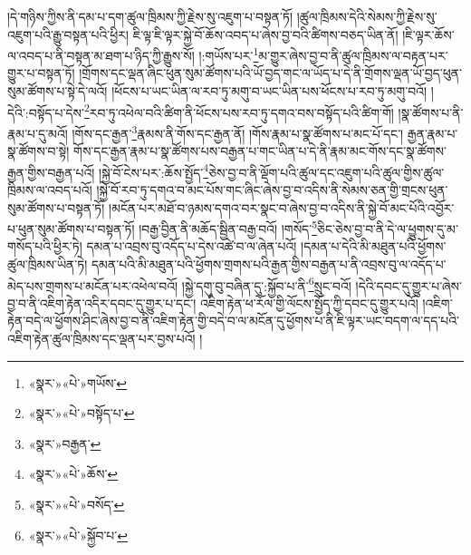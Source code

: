 །དེ་གཉིས་ཀྱིས་ནི་དམ་པ་དག་ཚུལ་ཁྲིམས་ཀྱི་རྗེས་སུ་འཇུག་པ་བསྟན་ཏོ། །ཚུལ་ཁྲིམས་དེའི་སེམས་ཀྱི་རྗེས་སུ་འཇུག་པའི་རྒྱུ་བསྟན་པའི་ཕྱིར། ཇི་ལྟ་ཇི་ལྟར་སྐྱེ་བོ་ཆོས་འབད་པ་ཞེས་བྱ་བའི་ཚིགས་བཅད་ཡིན་ནོ། །ཇི་ལྟར་ཆོས་ལ་འབད་པ་ནི་བསྟན་མ་ཐག་པ་ཉིད་ཀྱི་རྒྱུས་སོ། །:གཡོས་པར་\footnote{«སྣར་»«པེ་»གཡོས་}མ་གྱུར་ཞེས་བྱ་བ་ནི་ཚུལ་ཁྲིམས་ལ་བརྟན་པར་གྱུར་པ་བསྟན་ཏོ། །གྲོགས་དང་ལྡན་ཞིང་ཕུན་སུམ་ཚོགས་པའི་ཡོ་བྱད་གང་ལ་ཡོད་པ་དེ་ནི་གྲོགས་ལྡན་ཡོ་བྱད་ཕུན་སུམ་ཚོགས་པ་སྟེ་དེ་ལའོ། །ཕོངས་པ་ཡང་ཡིན་ལ་རབ་ཏུ་མགུ་བ་ཡང་ཡིན་པས་ཕོངས་པ་རབ་ཏུ་མགུ་བའོ། །དེའི་:བསྟོད་པ་དེས་\footnote{«སྣར་»«པེ་»བསྟོད་པ་}རབ་ཏུ་འཕེལ་བའི་ཚིག་ནི་ཕོངས་པས་རབ་ཏུ་དགའ་བས་བསྟོད་པའི་ཚིག་གོ། །སྣ་ཚོགས་པ་ནི་རྣམ་པ་དུ་མའོ། །གོས་དང་རྒྱན་\footnote{«སྣར་»བརྒྱན་}རྣམས་ནི་གོས་དང་རྒྱན་ནོ། །གོས་རྣམ་པ་སྣ་ཚོགས་པ་མང་པོ་དང་། རྒྱན་རྣམ་པ་སྣ་ཚོགས་བ་སྟེ། གོས་དང་རྒྱན་རྣམ་པ་སྣ་ཚོགས་པས་བརྒྱན་པ་གང་ཡིན་པ་དེ་ནི་རྣམ་མང་གོས་དང་སྣ་ཚོགས་རྒྱན་གྱིས་བརྒྱན་པའོ། །སྐྱེ་བོ་ངེས་པར་:ཆོས་སྤྱོད་\footnote{«སྣར་»«པེ་»ཆོས་}ཅེས་བྱ་བ་ནི་ལྡོག་པའི་ཚུལ་དང་འཇུག་པའི་ཚུལ་གྱིས་ཚུལ་ཁྲིམས་ལ་འབད་པའོ། །སྐྱེ་བོ་རབ་ཏུ་དགའ་བ་མང་པོས་གང་ཞིང་ཞེས་བྱ་བ་འདིས་ནི་སེམས་ཅན་གྱི་གྲངས་ཕུན་སུམ་ཚོགས་པ་བསྟན་ཏོ། །མངོན་པར་མཐོ་བ་ཉམས་དགའ་བར་སྣང་བ་ཞེས་བྱ་བ་འདིས་ནི་སྐྱེ་བོ་མང་པོའི་འབྱོར་པ་ཕུན་སུམ་ཚོགས་པ་བསྟན་ཏོ། །བརྒྱ་བྱིན་ནི་མཆོད་སྦྱིན་བརྒྱ་བའོ། །གསོད་\footnote{«སྣར་»«པེ་»བསོད་}ཅིང་ཅེས་བྱ་བ་ནི་དེ་ལ་ཕྱུགས་དུ་མ་གསོད་པའི་ཕྱིར་ཏེ། དམན་པ་འབྲས་བུ་འདོད་པ་དེས་འཚེ་བ་ལ་ཞེན་པའོ། །དམན་པ་དེའི་མི་མཐུན་པའི་ཕྱོགས་ཚུལ་ཁྲིམས་ཡིན་ཏེ། དམན་པའི་མི་མཐུན་པའི་ཕྱོགས་གྲགས་པའི་རྒྱན་གྱིས་བརྒྱན་པ་ནི་འབྲས་བུ་ལ་འདོད་པ་མེད་པས་གྲགས་པ་མངོན་པར་འཕེལ་བའོ། །སྐྱེ་དགུ་བུ་བཞིན་དུ་:སྐྱོབ་པ་ནི་\footnote{«སྣར་»«པེ་»སྐྱོབ་པ་}སྲུང་བའོ། །དེའི་དབང་དུ་གྱུར་པ་ཞེས་བྱ་བ་ནི་འཇིག་རྟེན་འདིར་དབང་དུ་གྱུར་པ་དང་། འཇིག་རྟེན་ཕ་རོལ་གྱི་ལོངས་སྤྱོད་ཀྱི་དབང་དུ་གྱུར་པའོ། །འཇིག་རྟེན་བདེ་ལ་ཕྱོགས་ཤིང་ཞེས་བྱ་བ་ནི་འཇིག་རྟེན་གྱི་བདེ་བ་ལ་མངོན་དུ་ཕྱོགས་པ་ནི་ཇི་ལྟར་ཡང་བདག་ལ་དད་པའི་འཇིག་རྟེན་ཚུལ་ཁྲིམས་དང་ལྡན་པར་བྱས་པའོ། །
